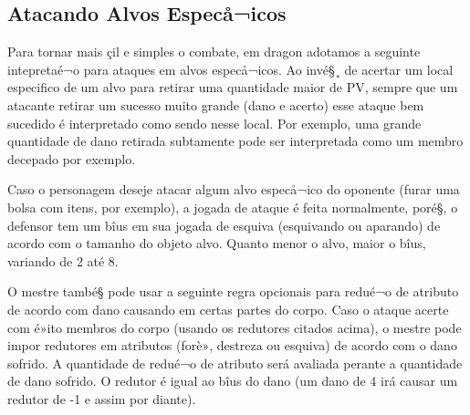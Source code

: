 

\subsection{Atacando Alvos Especå¬icos}

Para tornar mais çil e simples o combate, em dragon adotamos a seguinte intepretaé¬o para ataques em alvos especå¬icos. Ao invé§¸ de acertar um local especifico de um alvo para retirar uma quantidade maior de PV, sempre que um atacante retirar um sucesso muito grande (dano e acerto) esse ataque bem sucedido é interpretado como sendo nesse local. Por exemplo, uma grande quantidade de dano retirada subtamente pode ser interpretada como um membro decepado por exemplo.

Caso o personagem deseje atacar algum alvo especå¬ico do oponente (furar uma bolsa com itens, por exemplo), a jogada de ataque é feita normalmente, poré§, o defensor tem um bîus em sua jogada de esquiva (esquivando ou aparando) de acordo com o tamanho do objeto alvo. Quanto menor o alvo, maior o bîus, variando de 2 até 8.

O mestre també§ pode usar a seguinte regra opcionais para redué¬o de atributo de acordo com dano causando em certas partes do corpo. Caso o ataque acerte com é»ito membros do corpo (usando os redutores citados acima), o mestre pode impor redutores em atributos (forè», destreza ou esquiva) de acordo com o dano sofrido. A quantidade de redué¬o de atributo será avaliada perante a quantidade de dano sofrido. O redutor é igual ao bîus do dano (um dano de 4 irá causar um redutor de -1 e assim por diante).
  

